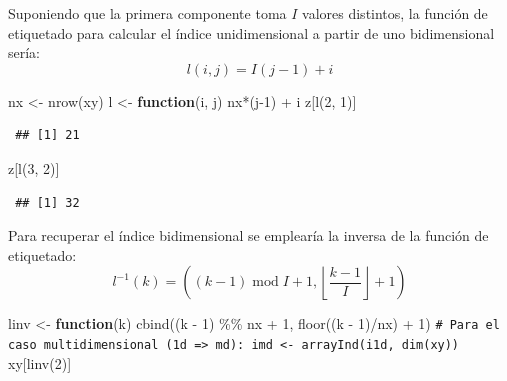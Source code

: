 \documentclass[
  10pt,
]{book}
\newenvironment{Shaded}{\begin{snugshade}}{\end{snugshade}}
\newcommand{\CommentTok}[1]{\textcolor[rgb]{0.56,0.35,0.01}{\textit{#1}}}
\newcommand{\ControlFlowTok}[1]{\textcolor[rgb]{0.13,0.29,0.53}{\textbf{#1}}}
\newcommand{\DecValTok}[1]{\textcolor[rgb]{0.00,0.00,0.81}{#1}}
\newcommand{\FunctionTok}[1]{\textcolor[rgb]{0.00,0.00,0.00}{#1}}
\newcommand{\NormalTok}[1]{#1}
\newcommand{\OtherTok}[1]{\textcolor[rgb]{0.56,0.35,0.01}{#1}}
\newcommand{\SpecialCharTok}[1]{\textcolor[rgb]{0.00,0.00,0.00}{#1}}
\theoremstyle{break}
\theoremstyle{nonumberplain}
\renewcommand{\CommentTok}[1]{\textcolor[rgb]{0.41,0.41,0.41}{\texttt{#1}}}
\begin{document}
Suponiendo que la primera componente toma \(I\) valores distintos, la función de etiquetado para calcular el índice unidimensional a partir de uno bidimensional sería:
\[l(i, j) = I(j-1) + i\]

\begin{Shaded}
\begin{Highlighting}[]
\NormalTok{nx }\OtherTok{\textless{}{-}} \FunctionTok{nrow}\NormalTok{(xy)}
\NormalTok{l }\OtherTok{\textless{}{-}} \ControlFlowTok{function}\NormalTok{(i, j) nx}\SpecialCharTok{*}\NormalTok{(j}\DecValTok{{-}1}\NormalTok{) }\SpecialCharTok{+}\NormalTok{ i}
\NormalTok{z[}\FunctionTok{l}\NormalTok{(}\DecValTok{2}\NormalTok{, }\DecValTok{1}\NormalTok{)]}
\end{Highlighting}
\end{Shaded}

\begin{verbatim}
 ## [1] 21
\end{verbatim}

\begin{Shaded}
\begin{Highlighting}[]
\NormalTok{z[}\FunctionTok{l}\NormalTok{(}\DecValTok{3}\NormalTok{, }\DecValTok{2}\NormalTok{)]}
\end{Highlighting}
\end{Shaded}

\begin{verbatim}
 ## [1] 32
\end{verbatim}

Para recuperar el índice bidimensional se emplearía la inversa de la función de etiquetado:
\[l^{-1}( k ) = \left(  (k -1) \operatorname{mod} I  + 1, \left\lfloor \frac{k - 1}{I}\right\rfloor + 1\right)\]

\begin{Shaded}
\begin{Highlighting}[]
\NormalTok{linv }\OtherTok{\textless{}{-}} \ControlFlowTok{function}\NormalTok{(k) }\FunctionTok{cbind}\NormalTok{((k }\SpecialCharTok{{-}} \DecValTok{1}\NormalTok{) }\SpecialCharTok{\%\%}\NormalTok{ nx }\SpecialCharTok{+} \DecValTok{1}\NormalTok{, }\FunctionTok{floor}\NormalTok{((k }\SpecialCharTok{{-}} \DecValTok{1}\NormalTok{)}\SpecialCharTok{/}\NormalTok{nx) }\SpecialCharTok{+} \DecValTok{1}\NormalTok{)}
\CommentTok{\# Para el caso multidimensional (1d =\textgreater{} md): imd \textless{}{-} arrayInd(i1d, dim(xy))}
\NormalTok{xy[}\FunctionTok{linv}\NormalTok{(}\DecValTok{2}\NormalTok{)]}
\end{Highlighting}
\end{Shaded}
\end{document}

